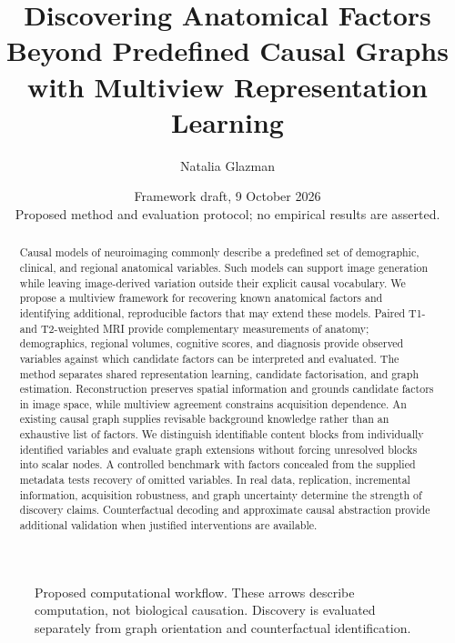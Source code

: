 \documentclass[10pt,twocolumn,letterpaper]{article}
\title{Discovering Anatomical Factors Beyond Predefined Causal Graphs\\with Multiview Representation Learning}
\author{Natalia Glazman}
\date{Framework draft, 9 October 2026\\\small Proposed method and evaluation protocol; no empirical results are asserted.}
\begin{document}
\maketitle

\begin{abstract}
Causal models of neuroimaging commonly describe a predefined set of demographic, clinical, and regional anatomical variables. Such models can support image generation while leaving image-derived variation outside their explicit causal vocabulary. We propose a multiview framework for recovering known anatomical factors and identifying additional, reproducible factors that may extend these models. Paired T1- and T2-weighted MRI provide complementary measurements of anatomy; demographics, regional volumes, cognitive scores, and diagnosis provide observed variables against which candidate factors can be interpreted and evaluated. The method separates shared representation learning, candidate factorisation, and graph estimation. Reconstruction preserves spatial information and grounds candidate factors in image space, while multiview agreement constrains acquisition dependence. An existing causal graph supplies revisable background knowledge rather than an exhaustive list of factors. We distinguish identifiable content blocks from individually identified variables and evaluate graph extensions without forcing unresolved blocks into scalar nodes. A controlled benchmark with factors concealed from the supplied metadata tests recovery of omitted variables. In real data, replication, incremental information, acquisition robustness, and graph uncertainty determine the strength of discovery claims. Counterfactual decoding and approximate causal abstraction provide additional validation when justified interventions are available.
\end{abstract}

\begin{figure}[t]
\centering
{}
\caption{Proposed computational workflow. These arrows describe computation, not biological causation. Discovery is evaluated separately from graph orientation and counterfactual identification.}
\label{fig:framework}
\end{figure}
\end{document}
